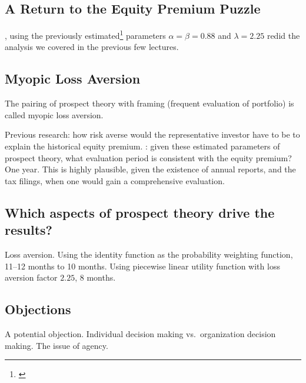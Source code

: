 \documentclass[oneside,reqno,letterpaper]{amsart}
\begin{document}
\subsection{A Return to the Equity Premium Puzzle}
\Textcite{Benartzi1995Myopic}, using the previously estimated\footnote{\textcite{Tversky1992Advances}} parameters \(\alpha = \beta = 0.88\) and \(\lambda = 2.25\) redid the analysis we covered in the previous few lectures.



\subsection{Myopic Loss Aversion}
The pairing of prospect theory with framing (frequent evaluation of portfolio) is called myopic loss aversion. 

Previous research: how risk averse would the representative investor have to be to explain the historical equity premium. 
\Textcite{Benartzi1995Myopic}: given these estimated parameters of prospect theory, what evaluation period is consistent with the equity premium? 
One year. This is highly plausible, given the existence of annual reports, and the tax filings, when one would gain a comprehensive evaluation. 


\subsection{Which aspects of prospect theory drive the results?}
Loss aversion. 
Using the identity function as the probability weighting function, 11--12 months to 10 months. 
Using piecewise linear utility function with loss aversion factor \(2.25\), 8 months.


\subsection{Objections}
A potential objection. 
Individual decision making vs.\ organization decision making. 
The issue of agency. 


\printbibliography
\end{document}
